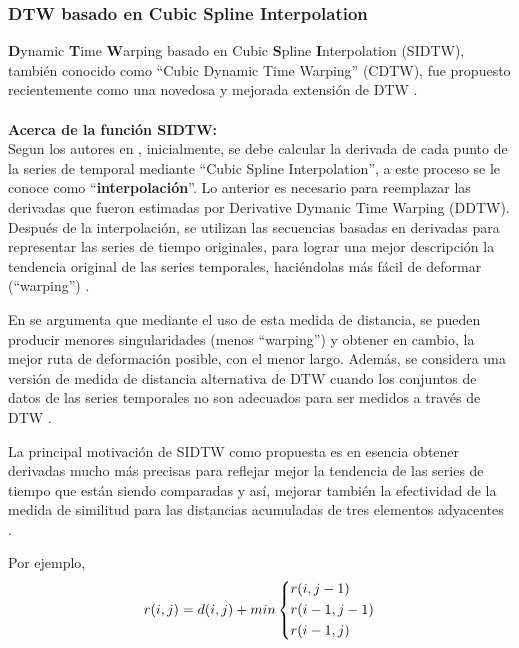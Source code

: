 \subsubsection{\textbf{DTW basado en Cubic Spline Interpolation}}
\textbf{D}ynamic \textbf{T}ime \textbf{W}arping basado en Cubic \textbf{S}pline \textbf{I}nterpolation (SIDTW), tambi\'en conocido como \enquote{Cubic Dynamic Time Warping} (CDTW),  fue propuesto recientemente como una novedosa y mejorada extensi\'on de DTW \cite{DTWcubicsplineinterpolation}.\\\\
\textbf{Acerca de la funci\'on SIDTW:}\\
Segun los autores en \cite{DTWcubicsplineinterpolation}, inicialmente, se debe calcular la derivada de cada punto de la series de temporal mediante \enquote{Cubic Spline Interpolation}, a este proceso se le conoce como \enquote{\textbf{interpolaci\'on}}. Lo anterior es necesario para reemplazar las derivadas que fueron estimadas por Derivative Dymanic Time Warping (DDTW). Despu\'es de la interpolaci\'on, se utilizan las secuencias basadas en derivadas para representar las series de tiempo originales, para lograr una mejor descripci\'on la tendencia original de las series temporales, haci\'endolas m\'as f\'acil de deformar (\enquote{warping}) \cite{DTWcubicsplineinterpolation}.\par
En \cite{DTWcubicsplineinterpolation} se argumenta que mediante el uso de esta medida de distancia, se pueden producir menores singularidades (menos \enquote{warping}) y obtener en cambio, la mejor ruta de deformaci\'on posible, con el menor largo. Adem\'as, se considera una versi\'on de medida de distancia alternativa de DTW cuando los conjuntos de datos de las series temporales no son adecuados para ser medidos a trav\'es de DTW \cite{DTWcubicsplineinterpolation}.\par
La principal motivaci\'on de SIDTW como propuesta es en esencia obtener derivadas mucho m\'as precisas para reflejar mejor la tendencia de las series de tiempo que est\'an siendo comparadas y as\'i, mejorar tambi\'en la efectividad de la medida de similitud para las distancias acumuladas de tres elementos adyacentes \cite{DTWcubicsplineinterpolation}.\par
Por ejemplo,
\[
	{r(i,j) = d(i,j) + min}
\begin{dcases}
    {r(i,j - 1)}	\\
    {r(i - 1,j - 1)}\\
    {r(i - 1,j)}    \\
\end{dcases}
\]

